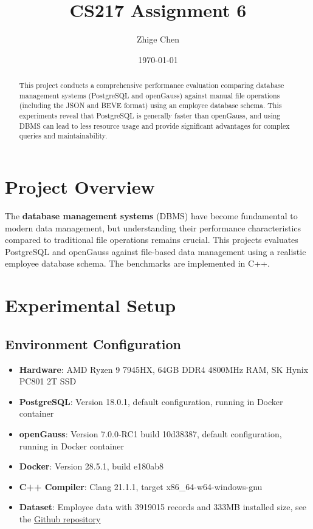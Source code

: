 \documentclass[14pt,a4paper]{article}
\title{CS217 Assignment 6}
\author{Zhige Chen\quad 12413315}
\affil{Department of Computer Science and Engineering, Southern University of Science and Technology, China}
\date{\today}
\begin{document}
    \maketitle
    \begin{abstract}
        This project conducts a comprehensive performance evaluation comparing database management systems (PostgreSQL and openGauss) against manual file operations (including the JSON and BEVE format) using an employee database schema. This experiments reveal that PostgreSQL is generally faster than openGauss, and using DBMS can lead to less resource usage and provide significant advantages for complex queries and maintainability.
    \end{abstract}
    \tableofcontents
    
    \section{Project Overview}
    The \textbf{database management systems} (DBMS) have become fundamental to modern data management, but understanding their performance characteristics compared to traditional file operations remains crucial. This projects evaluates PostgreSQL and openGauss against file-based data management using a realistic employee database schema. The benchmarks are implemented in C++.
    
    \section{Experimental Setup}
    \subsection{Environment Configuration}
    \begin{itemize}
        \item \textbf{Hardware}: AMD Ryzen 9 7945HX,  64GB DDR4 4800\unit{MHz} RAM, SK Hynix PC801 2T SSD
        \item \textbf{PostgreSQL}: Version 18.0.1, default configuration, running in Docker container
        \item \textbf{openGauss}: Version 7.0.0-RC1 build 10d38387, default configuration, running in Docker container
        \item \textbf{Docker}: Version 28.5.1, build e180ab8
        \item \textbf{C++ Compiler}: Clang 21.1.1, target x86\_64-w64-windows-gnu
        \item \textbf{Dataset}: Employee data with 3919015 records and 333\unit{MB} installed size, see the \href{https://github.com/neondatabase-labs/postgres-sample-dbs?tab=readme-ov-file#employees-database}{Github repository}
    \end{itemize}
    
\end{document}
